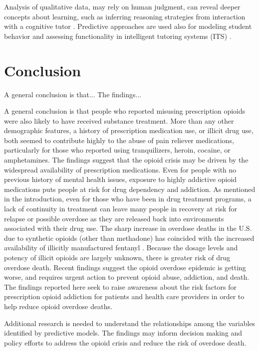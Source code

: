 \documentclass[sigconf]{acmart}
\begin{document}
Analysis of qualitative data, may rely on human judgment, can reveal deeper 
concepts about learning, such as inferring reasoning strategies from interaction 
with a cognitive tutor 
\cite{Fournier11}. Predictive approaches are used also for modeling student 
behavior and assessing functionality in intelligent tutoring systems (ITS)
\cite{penaayala14}. 




\section{Conclusion}

A general conclusion is that... 
The findings...

A general conclusion is that people who reported misusing prescription opioids 
were also likely to have received substance treatment. More than any other 
demographic features, a history of prescription medication use, or illicit drug 
use, both seemed to contribute highly to the abuse of pain reliever medications, 
particularly for those who reported using tranquilizers, heroin, cocaine, or 
amphetamines. The findings suggest that the opioid crisis may be driven by the 
widespread availability of prescription medications. Even for people with no 
previous history of mental health issues, exposure to highly addictive opioid 
medications puts people at risk for drug dependency and addiction. As mentioned 
in the introduction, even for those who have been in drug treatment programs, 
a lack of continuity in treatment can leave many people in recovery at risk 
for relapse or possible overdose as they are released back into environments 
associated with their drug use. The sharp increase in overdose deaths in the 
U.S. due to synthetic opioids (other than methadone) has coincided with the 
increased availability of illicitly manufactured fentanyl \cite{nida17}. 
Because the dosage levels and potency of illicit opioids are largely unknown, 
there is greater risk of drug overdose death. Recent findings suggest the 
opioid overdose epidemic is getting worse, and requires urgent action to prevent 
opioid abuse, addiction, and death. The findings reported here seek to raise 
awareness about the risk factors for prescription opioid addiction for patients 
and health care providers in order to help reduce opioid overdose deaths. 

Additional research 
is needed to understand the relationships among the variables identified by 
predictive models. The findings may inform decision making and policy efforts 
to address the opioid crisis and reduce the risk of overdose death. 


 
\end{document}
